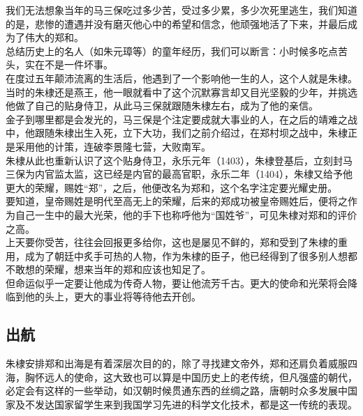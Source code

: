 \begin{multicols}{\theparacolNo}
我们无法想象当年的马三保吃过多少苦，受过多少累，多少次死里逃生，我们知道的是，悲惨的遭遇并没有磨灭他心中的希望和信念，他顽强地活了下来，并最后成为了伟大的郑和。\\

总结历史上的名人（如朱元璋等）的童年经历，我们可以断言：小时候多吃点苦头，实在不是一件坏事。\\

在度过五年颠沛流离的生活后，他遇到了一个影响他一生的人，这个人就是朱棣。\\

当时的朱棣还是燕王，他一眼就看中了这个沉默寡言却又目光坚毅的少年，并挑选他做了自己的贴身侍卫，从此马三保就跟随朱棣左右，成为了他的亲信。\\

金子到哪里都是会发光的，马三保是个注定要成就大事业的人，在之后的靖难之战中，他跟随朱棣出生入死，立下大功，我们之前介绍过，在郑村坝之战中，朱棣正是采用他的计策，连破李景隆七营，大败南军。\\

朱棣从此也重新认识了这个贴身侍卫，永乐元年（1403），朱棣登基后，立刻封马三保为内官监太监，这已经是内官的最高官职，永乐二年（1404），朱棣又给予他更大的荣耀，赐姓“郑”，之后，他便改名为郑和，这个名字注定要光耀史册。\\

要知道，皇帝赐姓是明代至高无上的荣耀，后来的郑成功被皇帝赐姓后，便将之作为自己一生中的最大光荣，他的手下也称呼他为“国姓爷”，可见朱棣对郑和的评价之高。\\

上天要你受苦，往往会回报更多给你，这也是屡见不鲜的，郑和受到了朱棣的重用，成为了朝廷中炙手可热的人物，作为朱棣的臣子，他已经得到了很多别人想都不敢想的荣耀，想来当年的郑和应该也知足了。\\

但命运似乎一定要让他成为传奇人物，要让他流芳千古。更大的使命和光荣将会降临到他的头上，更大的事业将等待他去开创。\\

\subsection{出航}
朱棣安排郑和出海是有着深层次目的的，除了寻找建文帝外，郑和还肩负着威服四海，胸怀远人的使命，这大致也可以算是中国历史上的老传统，但凡强盛的朝代，必定会有这样的一些举动，如汉朝时候贯通东西的丝绸之路，唐朝时众多发展中国家及不发达国家留学生来到我国学习先进的科学文化技术，都是这一传统的表现。\\


\end{multicols}
